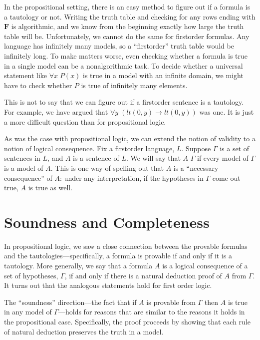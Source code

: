 \documentclass[letterpaper,10pt,english]{sphinxmanual}
\begin{document}
\sphinxAtStartPar
In the propositional setting, there is an easy method to figure out if a formula is a tautology or not. Writing the truth table and checking for any rows ending with \(\mathbf{F}\) is algorithmic, and we know from the beginning exactly how large the truth table will be. Unfortunately, we cannot do the same for first\sphinxhyphen{}order formulas. Any language has infinitely many models, so a “first\sphinxhyphen{}order” truth table would be infinitely long. To make matters worse, even checking whether a formula is true in a single model can be a non\sphinxhyphen{}algorithmic task. To decide whether a universal statement like \(\forall x \; P(x)\) is true in a model with an infinite domain, we might have to check whether \(P\) is true of infinitely many elements.

\sphinxAtStartPar
This is not to say that we can  figure out if a first\sphinxhyphen{}order sentence is a tautology. For example, we have argued that \(\forall y \; (\mathit{lt}(0, y) \to \mathit{lt}(0, y))\) was one. It is just a more difficult question than for propositional logic.

\sphinxAtStartPar
As was the case with propositional logic, we can extend the notion of validity to a notion of logical consequence. Fix a first\sphinxhyphen{}order language, \(L\). Suppose \(\Gamma\) is a set of sentences in \(L\), and \(A\) is a sentence of \(L\). We will say that \(A\)  \(\Gamma\) if every model of \(\Gamma\) is a model of \(A\). This is one way of spelling out that \(A\) is a “necessary consequence” of \(A\): under any interpretation, if the hypotheses in \(\Gamma\) come out true, \(A\) is true as well.


\section{Soundness and Completeness}
\label{\detokenize{semantics_of_first_order_logic:soundness-and-completeness}}
\sphinxAtStartPar
In propositional logic, we saw a close connection between the provable formulas and the tautologies—specifically, a formula is provable if and only if it is a tautology. More generally, we say that a formula \(A\) is a logical consequence of a set of hypotheses, \(\Gamma\), if and only if there is a natural deduction proof of \(A\) from \(\Gamma\). It turns out that the analogous statements hold for first order logic.

\sphinxAtStartPar
The “soundness” direction—the fact that if \(A\) is provable from \(\Gamma\) then \(A\) is true in any model of \(\Gamma\)—holds for reasons that are similar to the reasons it holds in the propositional case. Specifically, the proof proceeds by showing that each rule of natural deduction preserves the truth in a model.
\end{document}
